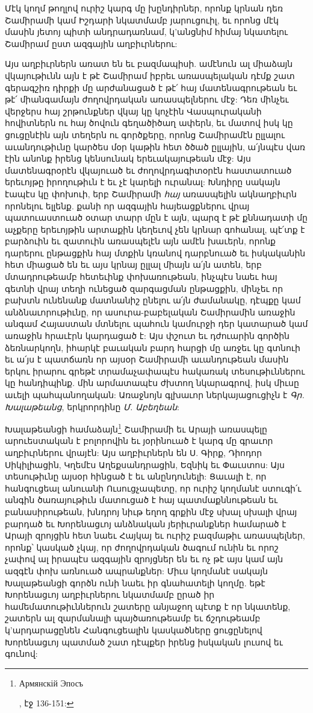 \documentclass{article}
\begin{document}
{Մէկ կողմ թողլով ուրիշ կարգ մը խընդիրներ, որոնք կրնան դեռ Շամիրամի կամ Իշդարի նկատմամբ յարուցուիլ, եւ որոնց մէկ մասին յետոյ պիտի անդրադառնամ, կ'անցնիմ հիմայ նկատելու Շամիրամ ըստ ազգային աղբիւրներու:

Այս աղբիւրներն առատ են եւ բազմապիսի. ամէնուն ալ միաձայն վկայութիւնն այն է թէ Շամիրամ իբրեւ առասպելական դէմք շատ գերագշիռ դիրքի մը արժանացած է թէ՛ հայ մատենագրութեան եւ թէ՛ միանգամայն ժողովրդական առասպելներու մէջ: Դեռ մինչեւ վերջերս հայ շրթունքներ վկայ կը կոչէին Վասպուրականի հովիտներն ու հայ ծովուն գեղածիծաղ ափերն, եւ մատով իսկ կը ցուցընէին այն տեղերն ու գործքերը, որոնց Շամիրամէն ըլլալու աւանդութիւնը կարծես մօր կաթին հետ ծծած ըլլային, ա՛յնպէս վառ էին անոնք իրենց կենսունակ երեւակայութեան մէջ: Այս մատենագրօրէն վկայուած եւ ժողովրդագիտօրէն հաստատուած երեւոյթը իրողութիւն է եւ չէ կարելի ուրանալ: Խնդիրը սակայն էապէս կը փոխուի, երբ Շամիրամի \emph{հայ} առասպելին ակնաղբիւրն որոնելու ելլենք. քանի որ ազգային հայեացքներու վրայ պատուաստուած օտար տարր մըն է այն, պարզ է թէ քննադատի մը աչքերը երեւոյթին արտաքին կեղեւով չեն կրնար գոհանալ, պէ՛տք է բարձուին եւ զատուին առասպելէն այն ամէն խաւերն, որոնք դարերու ընթացքին հայ մտքին կռանով դարբնուած եւ իսկականին հետ միացած են եւ այս կրնայ ըլլալ միայն ա՛յն ատեն, երբ մտադրութեամբ հետեւինք փոխառութեան, ինչպէս նաեւ հայ գետնի վրայ տեղի ունեցած զարգացման ընթացքին, մինչեւ որ բախտն ունենանք մատնանիշ ընելու ա՛յն ժամանակը, դէպքը կամ անձնաւորութիւնը, որ ասուրա-բաբելական Շամիրամին առաջին անգամ Հայաստան մտնելու պահուն կամուրջի դեր կատարած կամ առաջին հրաւէրն կարդացած է: Այս փշուտ եւ դժուարին գործին ձեռնարկողն, իհարկէ բաւական բարդ հարցի մը առջեւ կը գտնուի եւ ա՛յս է պատճառն որ այսօր Շամիրամի աւանդութեան մասին երկու իրարու գրեթէ տրամաչափապէս հակառակ տեսութիւններու կը հանդիպինք. մին արմատապէս ժխտող նկարագրով, իսկ միւսը աւելի պահպանողական: Առաջնոյն գլխաւոր ներկայացուցիչն է \emph{Գր. Խալաթեանց}, երկրորդինը \emph{Մ. Աբեղեան}:

Խալաթեանցի համաձայն\footnote{\begin{russian}Армянскій Эпосъ\end{russian}, էջ 136-151:} Շամիրամի եւ Արայի առասպելը արուեստական է բոլորովին եւ յօրինուած է կարգ մը գրաւոր աղբիւրներու վրայէն: Այս աղբիւրներն են Ս. Գիրք, Դիոդոր Սիկիլիացին, Կղեմէս Աղեքսանդրացին, Եզնիկ եւ Փաւստոս: Այս տեսութիւնը այսօր հինցած է եւ անընդունելի: Ցաւալի է, որ հանգուցեալ անուանի Ուսուցչապետը, որ ուրիշ կողմանէ ստուգի՛ւ անգին ծառայութիւն մատուցած է հայ պատմաքննութեան եւ բանասիրութեան, խնդրոյ նիւթ եղող գրքին մէջ սխալ սխալի վրայ բարդած եւ Խորենացւոյ անձնական յերիւրանքներ համարած է Արայի զրոյցին հետ նաեւ Հայկայ եւ ուրիշ բազմաթիւ առասպելներ, որոնք՝ կասկած չկայ, որ ժողովրդական ծագում ունին եւ որոշ չափով ալ իրապէս ազգային զրոյցներ են եւ ոչ թէ այս կամ այն ազգէն փոխ առնուած ապրանքներ: Միւս կողմանէ սակայն Խալաթեանցի գործն ունի նաեւ իր գնահատելի կողմը. եթէ Խորենացւոյ աղբիւրներու նկատմամբ ըրած իր համեմատութիւններուն շատերը անյաջող պէտք է որ նկատենք, շատերն ալ զարմանալի պայծառութեամբ եւ ճշդութեամբ կ'արդարացընեն Հանգուցեալին կասկածները ցուցընելով Խորենացւոյ պատմած շատ դէպքեր իրենց իսկական լուսով եւ գունով:

}
\end{document}
